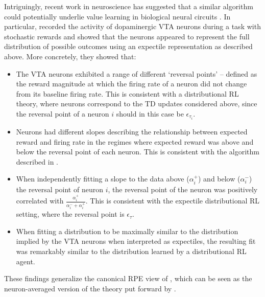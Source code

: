 Intriguingly, recent work in neuroscience has suggested that a similar algorithm could potentially underlie value learning in biological neural circuits \citep{dabney2020distributional,lowet2020distributional}.
In particular, \citet{dabney2020distributional} recorded the activity of dopaminergic VTA neurons during a task with stochastic rewards and showed that the neurons appeared to represent the full distribution of possible outcomes using an expectile representation as described above.
More concretely, they showed that:
\begin{itemize}
    \item The VTA neurons exhibited a range of different `reversal points' -- defined as the reward magnitude at which the firing rate of a neuron did not change from its baseline firing rate.
    This is consistent with a distributional RL theory, where neurons correspond to the TD updates considered above, since the reversal point of a neuron $i$ should in this case be $\epsilon_{\tau_i}$.
    \item Neurons had different slopes describing the relationship between expected reward and firing rate in the regimes where expected reward was above and below the reversal point of each neuron.
    This is consistent with the algorithm described in .
    \item When independently fitting a slope to the data above ($\alpha_i^+$) and below ($\alpha_i^-$) the reversal point of neuron $i$, the reversal point of the neuron was positively correlated with $\frac{\alpha_i^{+}}{\alpha_i^- + \alpha_i^+}$.
    This is consistent with the expectile distributional RL setting, where the reversal point is $\epsilon_\tau$.
    \item When fitting a distribution to be maximally similar to the distribution implied by the VTA neurons when interpreted as expectiles, the resulting fit was remarkably similar to the distribution learned by a distributional RL agent.
\end{itemize}
These findings generalize the canonical RPE view of \citet{schultz1997neural}, which can be seen as the neuron-averaged version of the theory put forward by \citet{dabney2020distributional}.

